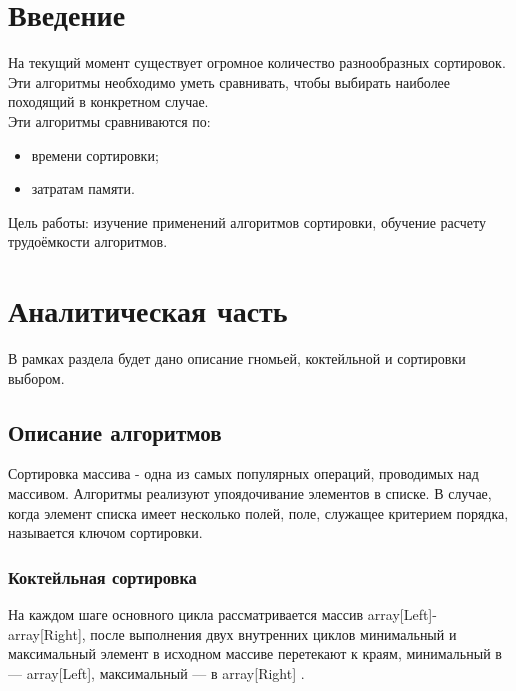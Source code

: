 \documentclass[a4paper,12pt]{report}
\begin{document}
	\setcounter{page}{2}
	\tableofcontents
    \chapter*{Введение}

        	На текущий момент существует огромное количество разнообразных сортировок.
        	Эти алгоритмы необходимо уметь сравнивать, чтобы выбирать наиболее походящий в конкретном случае.\\
        	Эти алгоритмы сравниваются по:
        	\begin{itemize}
        		\item времени сортировки;
        		\item затратам памяти.
        	\end{itemize}
        
			Цель работы: изучение применений алгоритмов сортировки, обучение расчету трудоёмкости алгоритмов.

        \label{sec:intro}

    \newpage

    \chapter{Аналитическая часть}
        \label{sec:analitic_part}

			В рамках раздела будет дано описание гномьей, коктейльной и сортировки выбором.

	\section{Описание алгоритмов}
        
			Сортировка массива - одна из самых популярных операций, проводимых над массивом.
			Алгоритмы реализуют упоядочивание элементов в списке.
			В случае, когда элемент списка имеет несколько полей, поле, служащее критерием порядка, называется ключом сортировки.

	\subsection{Коктейльная сортировка}

    		На каждом шаге основного цикла рассматривается массив array[Left]-array[Right], после выполнения двух внутренних циклов минимальный и максимальный элемент в исходном массиве перетекают к краям, минимальный в — array[Left], максимальный — в array[Right] \cite{Virt_cocktail}.
    		
\end{document}
